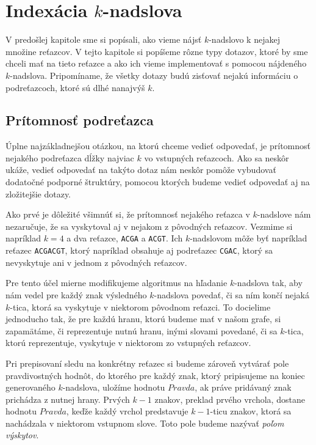 \chapter{Indexácia $k$-nadslova}

V predošlej kapitole sme si popísali, ako vieme nájsť $k$-nadslovo k nejakej
množine reťazcov. V tejto kapitole si popíšeme rôzne typy dotazov, ktoré by
sme chceli mať na tieto reťazce a ako ich vieme implementovať s pomocou
nájdeného $k$-nadslova. Pripomíname, že všetky dotazy budú zisťovať nejakú
informáciu o podreťazcoch, ktoré sú dlhé nanajvýš $k$.

\section{Prítomnosť podreťazca}

Úplne najzákladnejšou otázkou, na ktorú chceme vedieť odpovedať, je prítomnosť
nejakého podreťazca dĺžky najviac $k$ vo vstupných reťazcoch. Ako sa neskôr ukáže,
vedieť odpovedať na takýto dotaz nám neskôr pomôže vybudovať dodatočné podporné
štruktúry, pomocou ktorých budeme vedieť odpovedať aj na zložitejšie dotazy.

Ako prvé je dôležité všimnúť si, že prítomnosť nejakého reťazca v $k$-nadslove
nám nezaručuje, že sa vyskytoval aj v nejakom z pôvodných reťazcov. Vezmime si
napríklad $k = 4$ a dva reťazce, \texttt{ACGA} a \texttt{ACGT}. Ich $k$-nadslovom
môže byť napríklad reťazec \texttt{ACGACGT}, ktorý napríklad obsahuje aj
podreťazec \texttt{CGAC}, ktorý sa nevyskytuje ani v jednom z pôvodných reťazcov.

Pre tento účel mierne modifikujeme algoritmus na hľadanie $k$-nadslova tak, aby nám
vedel pre každý znak výsledného $k$-nadslova povedať, či sa ním končí nejaká $k$-tica,
ktorá sa vyskytuje v niektorom pôvodnom reťazci. To docielime jednoducho tak, že
pre každú hranu, ktorú budeme mať v našom grafe, si zapamätáme, či reprezentuje
nutnú hranu, inými slovami povedané, či sa $k$-tica, ktorú reprezentuje, vyskytuje
v niektorom zo vstupných reťazcov.

Pri prepisovaní sledu na konkrétny reťazec si budeme zároveň vytvárať pole
pravdivostných hodnôt, do ktorého pre každý znak, ktorý pripisujeme na koniec
generovaného $k$-nadslova, uložíme hodnotu $Pravda$, ak práve pridávaný znak
prichádza z nutnej hrany. Prvých $k-1$ znakov, preklad prvého vrchola, dostane
hodnotu $Pravda$, keďže každý vrchol predstavuje $k-1$-ticu znakov, ktorá sa
nachádzala v niektorom vstupnom slove. Toto pole budeme nazývať \emph{poľom výskytov}.

